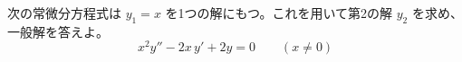 
次の常微分方程式は $y_{1} = x$ を1つの解にもつ。これを用いて第2の解 $y_{2}$ を求め、一般解を答えよ。
\[
x^{2} y'' - 2x\,y' + 2y = 0 \qquad (x \neq 0)
\]
